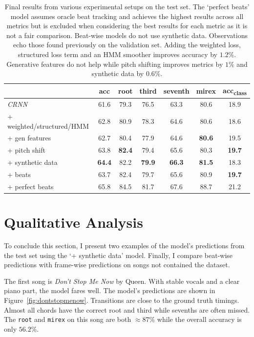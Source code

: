 \begin{table}[H]
    \centering
    \begin{tabular}{lcccccc}
        \toprule
         & acc & root & third & seventh & mirex & acc\textsubscript{class} \\
        \midrule
        \emph{CRNN}               & 61.6  & 79.3  & 76.5  & 63.3  & 80.6  & 18.9 \\
        + weighted/structured/HMM & 62.8  & 80.9  & 78.3  & 64.6  & 80.6  & 18.6 \\
        + gen features           & 62.7  & 80.4  & 77.9  & 64.6  & \textbf{80.6}  & 19.5 \\
        + pitch shift           & 63.8  & \textbf{82.4}  & 79.4  & 65.6  & 80.3  & \textbf{19.7} \\
        + synthetic data         & \textbf{64.4}  & 82.2  & \textbf{79.9}  & \textbf{66.3}  & \textbf{81.5}  & 18.3 \\
        + beats & 63.7  & 82.4  & 79.7  & 65.6  & 80.9  & \textbf{19.7} \\
        \midrule
        + perfect beats          & 65.8  & 84.5  & 81.7  & 67.6  & 88.7  & 21.2 \\
        \bottomrule
    \end{tabular}
    \caption{Final results from various experimental setups on the test set. The `perfect beats' model assumes oracle beat tracking and achieves the highest results across all metrics but is excluded when considering the best results for each metric as it is not a fair comparison. Beat-wise models do not use synthetic data. Observations echo those found previously on the validation set. Adding the weighted loss, structured loss term and an HMM smoother improves accuracy by $1.2\%$. Generative features do not help while pitch shifting improves metrics by $1\%$ and synthetic data by $0.6\%$.}\label{tab:test_set}
\end{table}


\section{Qualitative Analysis}

To conclude this section, I present two examples of the model's predictions from the test set using the `+ synthetic data' model. Finally, I compare beat-wise predictions with frame-wise predictions on songs not contained the dataset.

The first song is \emph{Don't Stop Me Now} by Queen. With stable vocals and a clear piano part, the model fares well. The model's predictions are shown in Figure~\ref{fig:dontstopmenow}. Transitions are close to the ground truth timings. Almost all chords have the correct root and third while sevenths are often missed. The \texttt{root} and \texttt{mirex} on this song are both $\approx 87\%$ while the overall accuracy is only $56.2\%$.

